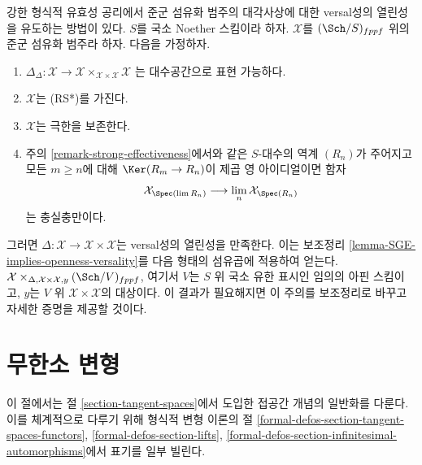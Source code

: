 \begin{remark}
\label{remark-trade-openness-versality-diagonal-with-strong-effectiveness}
강한 형식적 유효성 공리에서 준군 섬유화 범주의 대각사상에 대한
versal성의 열린성을 유도하는 방법이 있다.
$S$를 국소 Noether 스킴이라 하자. $\mathcal{X}$를
$(\Sch/S)_{fppf}$ 위의 준군 섬유화 범주라 하자. 다음을 가정하자.
\begin{enumerate}
\item $\Delta_\Delta : \mathcal{X} \to
\mathcal{X} \times_{\mathcal{X} \times \mathcal{X}} \mathcal{X}$
는 대수공간으로 표현 가능하다.
\item $\mathcal{X}$는 (RS*)를 가진다.
\item $\mathcal{X}$는 극한을 보존한다.
\item 주의 \ref{remark-strong-effectiveness}에서와 같은
$S$-대수의 역계 $(R_n)$가 주어지고 모든 $m \geq n$에 대해
$\Ker(R_m \to R_n)$이 제곱 영 아이디얼이면 함자
$$
\mathcal{X}_{\Spec(\lim R_n)} \longrightarrow
\lim_n \mathcal{X}_{\Spec(R_n)}
$$
는 충실충만이다.
\end{enumerate}
그러면 $\Delta : \mathcal{X} \to \mathcal{X} \times \mathcal{X}$는
versal성의 열린성을 만족한다. 이는 보조정리
\ref{lemma-SGE-implies-openness-versality}를 다음 형태의 섬유곱에
적용하여 얻는다.
$\mathcal{X} \times_{\Delta, \mathcal{X} \times \mathcal{X}, y}
(\Sch/V)_{fppf}$,
여기서 $V$는 $S$ 위 국소 유한 표시인 임의의 아핀 스킴이고,
$y$는 $V$ 위 $\mathcal{X} \times \mathcal{X}$의 대상이다.
이 결과가 필요해지면 이 주의를 보조정리로 바꾸고 자세한 증명을
제공할 것이다.
\end{remark}











\section{무한소 변형}
\label{section-inf}

\noindent
이 절에서는 절 \ref{section-tangent-spaces}에서 도입한 접공간 개념의
일반화를 다룬다. 이를 체계적으로 다루기 위해 형식적 변형 이론의 절
\ref{formal-defos-section-tangent-spaces-functors},
\ref{formal-defos-section-lifts},
\ref{formal-defos-section-infinitesimal-automorphisms}에서 표기를 일부 빌린다.

